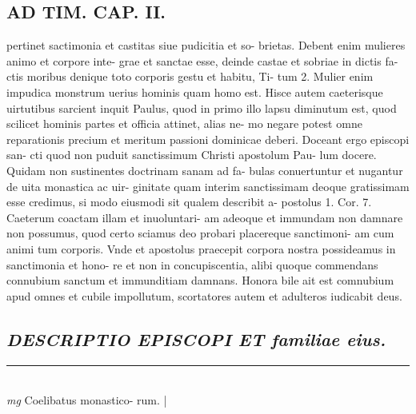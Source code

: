 \documentclass{article}
\begin{document}
\begin{pages}
\section*{AD TIM. CAP. II. }
\marginpar{[ p.122 ]}\pstart pertinet sactimonia et castitas siue pudicitia et so- brietas. Debent enim mulieres animo et corpore inte- grae et sanctae esse, deinde castae et sobriae in dictis fa- ctis moribus denique toto corporis gestu et habitu, Ti- tum 2. Mulier enim impudica monstrum uerius hominis quam homo est. Hisce autem caeterisque uirtutibus sarcient inquit Paulus, quod in primo illo lapsu diminutum est, quod scilicet hominis partes et officia attinet, alias ne- mo negare potest omne reparationis precium et meritum passioni dominicae deberi. Doceant ergo episcopi san- cti quod non puduit sanctissimum Christi apostolum Pau- lum docere. Quidam non sustinentes doctrinam sanam ad fa- bulas conuertuntur et nugantur de uita monastica ac uir- ginitate quam interim sanctissimam deoque gratissimam esse credimus, si modo eiusmodi sit qualem describit a- postolus 1. Cor. 7. Caeterum coactam illam et inuoluntari- am adeoque et immundam non damnare non possumus, quod certo sciamus deo probari placereque sanctimoni- am cum animi tum corporis. Vnde et apostolus praecepit corpora nostra possideamus in sanctimonia et hono- re et non in concupiscentia, alibi quoque commendans connubium sanctum et immunditiam damnans. Honora bile ait est comnubium apud omnes et cubile impollutum, scortatores autem et adulteros iudicabit deus.  \pend
{}
{}
\subsection*{\textit{DESCRIPTIO EPISCOPI ET familiae eius. }}
\vspace{0.5cm}\noindent
\vspace{0.2cm}\rule{1cm}{0.2pt}\\ 
\hspace{0.2cm}\textit{mg}
\footnotesize Coelibatus monastico- rum. 
\normalsize| 

\end{pages}
\end{document}
